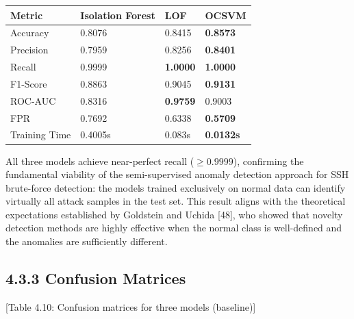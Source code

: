 \documentclass[
  a4paper]{report}
\newcounter{none} %
\begin{document}
{\def\LTcaptype{none} %
\begin{longtable}[]{@{}llll@{}}
\toprule\noalign{}
Metric & Isolation Forest & LOF & OCSVM \\
\midrule\noalign{}
\endhead
\bottomrule\noalign{}
\endlastfoot
Accuracy & 0.8076 & 0.8415 & \textbf{0.8573} \\
Precision & 0.7959 & 0.8256 & \textbf{0.8401} \\
Recall & 0.9999 & \textbf{1.0000} & \textbf{1.0000} \\
F1-Score & 0.8863 & 0.9045 & \textbf{0.9131} \\
ROC-AUC & 0.8316 & \textbf{0.9759} & 0.9003 \\
FPR & 0.7692 & 0.6338 & \textbf{0.5709} \\
Training Time & 0.4005s & 0.083s & \textbf{0.0132s} \\
\end{longtable}
}

All three models achieve near-perfect recall (\(\geq 0.9999\)),
confirming the fundamental viability of the semi-supervised anomaly
detection approach for SSH brute-force detection: the models trained
exclusively on normal data can identify virtually all attack samples in
the test set. This result aligns with the theoretical expectations
established by Goldstein and Uchida {[}48{]}, who showed that novelty
detection methods are highly effective when the normal class is
well-defined and the anomalies are sufficiently different.

\subsection{4.3.3 Confusion Matrices}\label{confusion-matrices}

{[}Table 4.10: Confusion matrices for three models (baseline){]}
\end{document}
